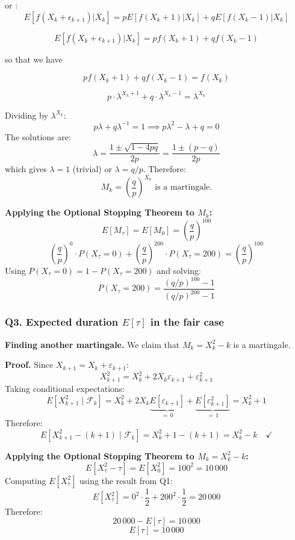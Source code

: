 or : 
\[
E[f(X_{k} + \epsilon_{k+1}) | X_k] = pE[f(X_{k} + 1) | X_k] + qE[f(X_{k} - 1) | X_k]
\]

\[
E[f(X_{k} + \epsilon_{k+1}) | X_k] = pf(X_{k} + 1) + qf(X_{k} - 1)
\]


so that we have 

\[
pf(X_{k} + 1) + qf(X_{k} - 1)  = f(X_{k})
\]

\[
p \cdot \lambda^{X_k + 1} + q \cdot \lambda^{X_k - 1} = \lambda^{X_k}
\]

Dividing by $\lambda^{X_k}$:
\[
p\lambda + q\lambda^{-1} = 1 \implies p\lambda^2 - \lambda + q = 0
\]
The solutions are:
\[
\lambda = \frac{1 \pm \sqrt{1 - 4pq}}{2p} = \frac{1 \pm (p - q)}{2p}
\]
which gives $\lambda = 1$ (trivial) or $\lambda = q/p$. Therefore:
\[
M_k = \left(\frac{q}{p}\right)^{X_k} \text{ is a martingale.}
\]

\textbf{Applying the Optional Stopping Theorem to $M_k$:}
\[
E[M_\tau] = E[M_0] = \left(\frac{q}{p}\right)^{100}
\]
\[
\left(\frac{q}{p}\right)^{0} \cdot P(X_\tau = 0) + \left(\frac{q}{p}\right)^{200} \cdot P(X_\tau = 200) = \left(\frac{q}{p}\right)^{100}
\]
Using $P(X_\tau = 0) = 1 - P(X_\tau = 200)$ and solving:
\[
\boxed{P(X_\tau = 200) = \frac{(q/p)^{100} - 1}{(q/p)^{200} - 1}}
\]


\subsubsection*{Q3. Expected duration $E[\tau]$ in the fair case}

\textbf{Finding another martingale.} We claim that $M_k = X_k^2 - k$ is a martingale.

\textbf{Proof.} Since $X_{k+1} = X_k + \varepsilon_{k+1}$:
\[
X_{k+1}^2 = X_k^2 + 2X_k \varepsilon_{k+1} + \varepsilon_{k+1}^2
\]
Taking conditional expectations:
\[
E[X_{k+1}^2 \mid \mathcal{F}_k] = X_k^2 + 2X_k \underbrace{E[\varepsilon_{k+1}]}_{=\,0} + \underbrace{E[\varepsilon_{k+1}^2]}_{=\,1} = X_k^2 + 1
\]
Therefore:
\[
E[X_{k+1}^2 - (k+1) \mid \mathcal{F}_k] = X_k^2 + 1 - (k+1) = X_k^2 - k \quad \checkmark
\]

\textbf{Applying the Optional Stopping Theorem to $M_k = X_k^2 - k$:}
\[
E[X_\tau^2 - \tau] = E[X_0^2] = 100^2 = 10\,000
\]
Computing $E[X_\tau^2]$ using the result from Q1:
\[
E[X_\tau^2] = 0^2 \cdot \frac{1}{2} + 200^2 \cdot \frac{1}{2} = 20\,000
\]
Therefore:
\[
20\,000 - E[\tau] = 10\,000
\]
\[
\boxed{E[\tau] = 10\,000}
\]

